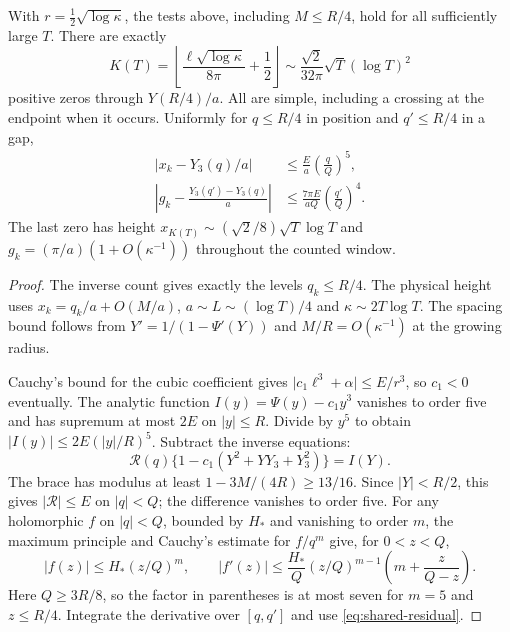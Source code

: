 \begin{theorem}\label{thm:growing-window}
With \(r=\tfrac12\sqrt{\log\kappa}\), the tests above, including
\(M\le R/4\), hold for all sufficiently large \(T\). There are exactly
\begin{equation}
 K(T)=\left\lfloor\frac{\ell\sqrt{\log\kappa}}{8\pi}+\frac12\right\rfloor
 \sim\frac{\sqrt{2}}{32\pi}\sqrt T(\log T)^2
 \label{eq:growing-count}
\end{equation}
positive zeros through \(Y(R/4)/a\). All are simple, including a
crossing at the endpoint when it occurs. Uniformly for \(q\le R/4\)
in position and \(q'\le R/4\) in a gap,
\begin{align}
 |x_k-Y_3(q)/a|
 &\le\frac{E}{a}\left(\frac{q}{Q}\right)^5,\nonumber\\
 \left|g_k-\frac{Y_3(q')-Y_3(q)}{a}\right|
 &\le \frac{7\pi E}{aQ}\left(\frac{q'}{Q}\right)^4 .
 \label{eq:growing-errors}
\end{align}
The last zero has height \(x_{K(T)}\sim(\sqrt{2}/8)\sqrt T\log T\)
and \(g_k=(\pi/a)(1+O(\kappa^{-1}))\) throughout the counted window.
\end{theorem}
\begin{proof}
The inverse count gives exactly the levels \(q_k\le R/4\).
The physical height uses \(x_k=q_k/a+O(M/a)\),
\(a\sim L\sim(\log T)/4\) and \(\kappa\sim2T\log T\).
The spacing bound follows from \(Y'=1/(1-\Psi'(Y))\) and
\(M/R=O(\kappa^{-1})\) at the growing radius.

Cauchy's bound for the cubic coefficient gives
\(\lvert c_1\ell^3+\alpha\rvert\le E/r^3\), so \(c_1<0\) eventually.
The analytic function \(I(y)=\Psi(y)-c_1y^3\) vanishes to order five
and has supremum at most \(2E\) on \(|y|\le R\). Divide by \(y^5\)
to obtain \(|I(y)|\le2E(|y|/R)^5\). Subtract the inverse equations:
\[
 \mathcal R(q)\{1-c_1(Y^2+YY_3+Y_3^2)\}=I(Y).
\]
The brace has modulus at least \(1-3M/(4R)\ge13/16\).
Since \(|Y|<R/2\), this gives \(|\mathcal R|\le E\) on \(|q|<Q\);
the difference vanishes to order five. For any holomorphic \(f\) on
\(|q|<Q\), bounded by \(H_*\) and vanishing to order \(m\), the maximum
principle and Cauchy's estimate for \(f/q^m\) give, for \(0<z<Q\),
\[
 |f(z)|\le H_*(z/Q)^m,\qquad
 |f'(z)|\le \frac{H_*}{Q}(z/Q)^{m-1}\left(m+\frac{z}{Q-z}\right).
\]
Here \(Q\ge3R/8\), so the factor in parentheses is at most seven for
\(m=5\) and \(z\le R/4\). Integrate the derivative over \([q,q']\)
and use \eqref{eq:shared-residual}.
\end{proof}

